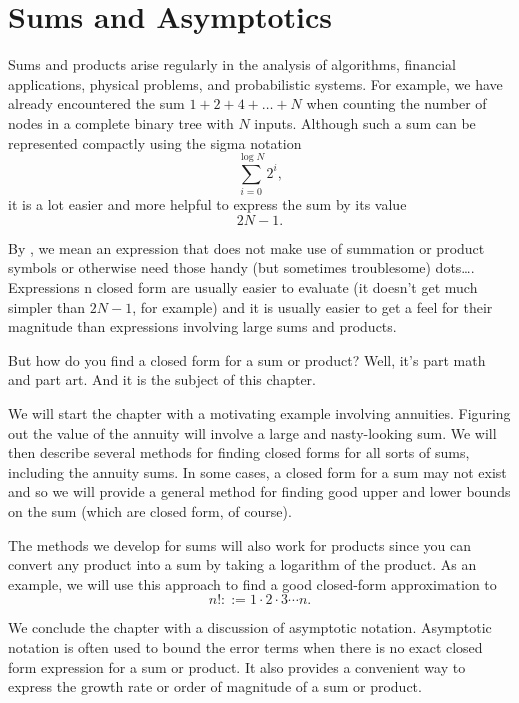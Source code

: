 \chapter{Sums and Asymptotics}\label{asymptotics_chap}

Sums and products arise regularly in the analysis of algorithms,
financial applications, physical problems, and probabilistic systems.
For example, we have already encountered the sum $1 + 2 + 4 + \dots +
N$ when counting the number of nodes in a complete binary tree with
$N$ inputs.  Although such a sum can be represented compactly using
the sigma notation
\begin{equation}
    \sum_{i = 0}^{\log N} 2^i,
\end{equation}
it is a lot easier and more helpful to express the sum by
its  value
\begin{equation*}
    2 N - 1.
\end{equation*}

By , we mean an expression that does not make use of
summation or product symbols or otherwise need those handy (but
sometimes troublesome) dots\dots.  Expressions n closed form are
usually easier to evaluate (it doesn't get much simpler than $2 N -
1$, for example) and it is usually easier to get a feel for their
magnitude than expressions involving large sums and products.

But how do you find a closed form for a sum or product?  Well, it's
part math and part art.  And it is the subject of this chapter.

We will start the chapter with a motivating example involving
annuities.  Figuring out the value of the annuity will involve a
large and nasty-looking sum.  We will then describe several methods
for finding closed forms for all sorts of sums, including the annuity
sums.  In some cases, a closed form for a sum may not exist and so we
will provide a general method for finding good upper and lower bounds
on the sum (which are closed form, of course).

The methods we develop for sums will also work for products since you
can convert any product into a sum by taking a logarithm of the
product.  As an example, we will use this approach to find a good
closed-form approximation to
\begin{equation*}
    n! ::= 1 \cdot 2 \cdot 3 \cdots n.
\end{equation*}

We conclude the chapter with a discussion of asymptotic notation.
Asymptotic notation is often used to bound the error terms when there
is no exact closed form expression for a sum or product.  It also
provides a convenient way to express the growth rate or order of
magnitude of a sum or product.


